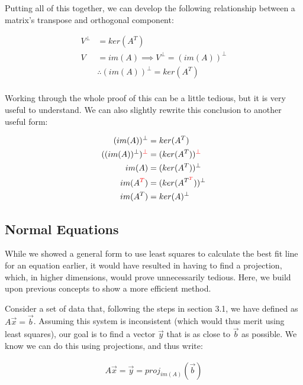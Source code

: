 \documentclass[12pt]{article}
\begin{document}
{Putting all of this together, we can develop the following relationship between a matrix's transpose and orthogonal component:

\begin{equation}
    \begin{split}
        V^\bot &= ker(A^T)\\
        V &= im(A) \implies V^\bot = (im(A))^\bot\\
        &\therefore (im(A))^\bot = ker(A^T)\\
    \end{split}
\end{equation}

Working through the whole proof of this can be a little tedious, but it is very useful to understand. We can also slightly rewrite this conclusion to another useful form:

\begin{equation}
    \begin{split}
        (im(A))^\bot &= ker(A^T)\\
        ((im(A))^\bot)^{\textcolor{red}{\bot}} &= (ker(A^T))^{\textcolor{red}{\bot}}\\
        im(A) &= (ker(A^T))^\bot\\
        im(A^{\textcolor{red}{T}}) &= (ker(A^{T^{\textcolor{red}{T}}}))^{\bot}\\
        im(A^T) &= ker(A)^\bot
    \end{split}
\end{equation}

\subsection{Normal Equations}

While we showed a general form to use least squares to calculate the best fit line for an equation earlier, it would have resulted in having to find a projection, which, in higher dimensions, would prove unnecessarily tedious. Here, we build upon previous concepts to show a more efficient method.

Consider a set of data that, following the steps in section 3.1, we have defined as $A\vec{x} = \vec{b}$. Assuming this system is inconsistent (which would thus merit using least squares), our goal is to find a vector $\vec{y}$ that is as close to $\vec{b}$ as possible. We know we can do this using projections, and thus write:

\begin{equation}
    \begin{split}
        A\vec{x} = \vec{y} = proj_{im(A)}(\vec{b})
    \end{split}
\end{equation}

}
\end{document}
